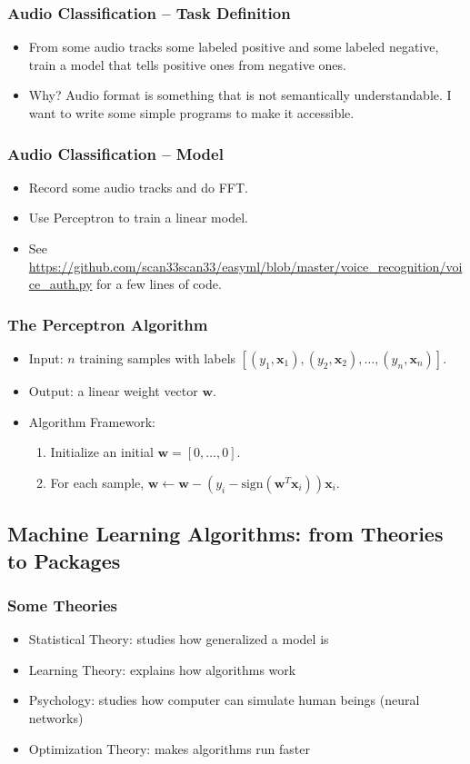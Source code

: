 \documentclass{beamer}
\def\bw{{\boldsymbol w}}
\def\bx{{\boldsymbol x}}
\begin{document}
\begin{frame}
  \frametitle{Audio Classification -- Task Definition}
  \begin{itemize}
    \item From some audio tracks some labeled positive and some labeled negative, train a model that tells positive ones from negative ones.
    \item Why? Audio format is something that is not semantically understandable. I want to write some simple programs to make it accessible.
  \end{itemize}
\end{frame} 

\begin{frame}
  \frametitle{Audio Classification -- Model}
  \begin{itemize}
    \item Record some audio tracks and do FFT.
    \item Use Perceptron to train a linear model.
    \item See {\scriptsize \url{https://github.com/scan33scan33/easyml/blob/master/voice_recognition/voice_auth.py}} for a few lines of code.
  \end{itemize}
\end{frame} 

\begin{frame}
  \frametitle{The Perceptron Algorithm}
  \begin{itemize}
    \item Input: $n$ training samples with labels $[(y_1, \bx_1), (y_2, \bx_2), \ldots, (y_n, \bx_n)]$.
    \item Output: a linear weight vector $\bw$.
    \item Algorithm Framework:
    \begin{enumerate}
    \item Initialize an initial $\bw = [0, \ldots, 0]$. 
    \item For each sample, $\bw \leftarrow \bw - (y_i - \text{sign}(\bw^T \bx_i)) \bx_i$.
    \end{enumerate}
  \end{itemize}
\end{frame} 

\subsection{Machine Learning Algorithms: from Theories to Packages}

\begin{frame}
  \frametitle{Some Theories}
  \begin{itemize}
    \item Statistical Theory: studies how generalized a model is
    \item Learning Theory: explains how algorithms work
    \item Psychology: studies how computer can simulate human beings (neural networks)
    \item Optimization Theory: makes algorithms run faster
  \end{itemize}
\end{frame} 
\end{document}
